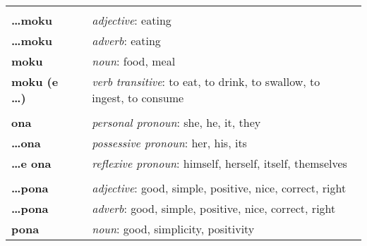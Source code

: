 \begin{supertabular}{p{2,5cm}|ll}
                            &  &                                                                                                         \\ %
    \textbf{\dots moku}     &  & \textit{adjective}: eating                                                                              \\ %
    \textbf{\dots moku}     &  & \textit{adverb}: eating                                                                                 \\ %
    \textbf{moku}           &  & \textit{noun}: food, meal                                                                               \\ %
    \textbf{moku (e \dots)} &  & \textit{verb transitive}: to eat, to drink, to swallow, to ingest, to consume                           \\ %
                            &  &                                                                                                         \\ %
    \textbf{ona}            &  & \textit{personal pronoun}: she, he, it, they                                                            \\ %
    \textbf{\dots ona}      &  & \textit{possessive pronoun}: her, his, its                                                              \\  %
    \textbf{\dots e ona}    &  & \textit{reflexive pronoun}: himself, herself, itself, themselves                                        \\
                            &  &                                                                                                         \\ %
    \textbf{\dots pona}     &  & \textit{adjective}: good, simple, positive, nice, correct, right                                        \\ %
    \textbf{\dots pona}     &  & \textit{adverb}: good, simple, positive, nice, correct, right                                           \\ %
    \textbf{pona}           &  & \textit{noun}: good, simplicity, positivity                                                             \\ %

\end{supertabular}
